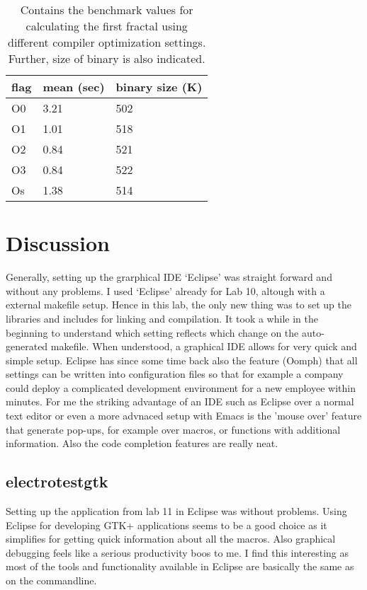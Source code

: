 \documentclass[a4paper,11pt,twoside]{article}
\begin{document}
\begin{table}[]
\centering
\caption{Contains the benchmark values for calculating the first fractal using
different compiler optimization settings. Further, size of binary is also indicated.}
\label{tab:benchmark}
\begin{tabular}{lll}
flag & mean (sec) & binary size (K) \\ \hline
O0   & 3.21       & 502   \\
O1   & 1.01       & 518   \\
O2   & 0.84       & 521   \\
O3   & 0.84       & 522   \\
Os   & 1.38       & 514
\end{tabular}
\end{table}

\section{Discussion}
Generally, setting up the grarphical IDE `Eclipse' was straight forward and without
any problems. I used `Eclipse' already for Lab 10, altough with a external makefile
setup. Hence in this lab, the only new thing was to set up the libraries and
includes for linking and compilation. It took a while in the beginning to understand
which setting reflects which change on the auto-generated makefile. When understood,
a graphical IDE allows for very quick and simple setup. Eclipse has since some time
back also the feature (Oomph) that all settings can be written into configuration files so
that for example a company could deploy a complicated development environment for
a new employee within minutes. For me the striking advantage of an IDE such as Eclipse
over a normal text editor or even a more advnaced setup with Emacs is the 'mouse over'
feature that generate pop-ups, for example over macros, or functions with additional
information. Also the code completion features are really neat.

\subsection{electrotestgtk}
Setting up the application from lab 11 in Eclipse was without problems. Using
Eclipse for developing GTK+ applications seems to be a good choice as it simplifies
for getting quick information about all the macros. Also graphical debugging feels
like a serious productivity boos to me. I find this interesting as most of the tools
and functionality available in Eclipse are basically the same as on the commandline.
\end{document}
